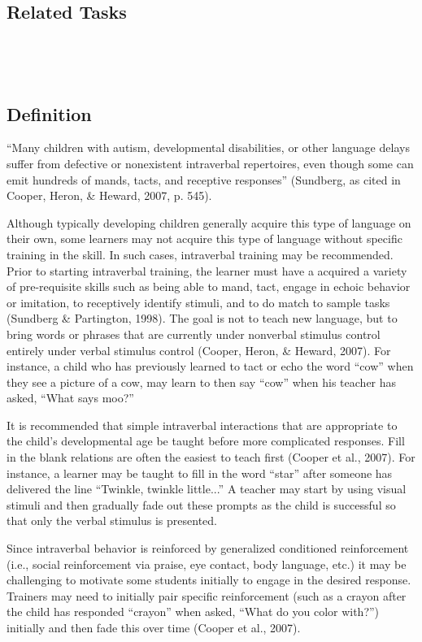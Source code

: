 \subsection{Related Tasks}
\fourdTwelve{}\\
\fourFKFourtyFive{}\\
%
%
%
%
%
%
%
%
%
%
\section{\fourdThirteen{}}
\subsection{Definition}
``Many children with autism, developmental disabilities, or other language delays suffer from defective or nonexistent intraverbal repertoires, even though some can emit hundreds of mands, tacts, and receptive responses'' (Sundberg, as cited in Cooper, Heron, \& Heward, 2007, p. 545).  

Although typically developing children generally acquire this type of language on their own, some learners may not acquire this type of language without specific training in the skill.  In such cases, intraverbal training may be recommended.  Prior to starting intraverbal training, the learner must have a acquired a variety of pre-requisite skills such as being able to mand, tact, engage in echoic behavior or imitation, to receptively identify stimuli, and to do match to sample tasks (Sundberg \& Partington, 1998). The goal is not to teach new language, but to bring words or phrases that are currently under nonverbal stimulus control entirely under verbal stimulus control (Cooper, Heron, \& Heward, 2007).  For instance, a child who has previously learned to tact or echo the word ``cow'' when they see a picture of a cow, may learn to then say ``cow'' when his teacher has asked, ``What says moo?''

It is recommended that simple intraverbal interactions that are appropriate to the child's developmental age be taught before more complicated responses.  Fill in the blank relations are often the easiest to teach first (Cooper et al., 2007).  For instance, a learner may be taught to fill in the word ``star'' after someone has delivered the line ``Twinkle, twinkle little...''    A teacher may start by using visual stimuli and then gradually fade out these prompts as the child is successful so that only the verbal stimulus is presented.  

Since intraverbal behavior is reinforced by generalized conditioned reinforcement (i.e., social reinforcement via praise, eye contact, body language, etc.) it may be challenging to motivate some students initially to engage in the desired response.  Trainers may need to initially pair specific reinforcement (such as a crayon after the child has responded ``crayon'' when asked, ``What do you color with?'') initially and then fade this over time (Cooper et al., 2007). 

